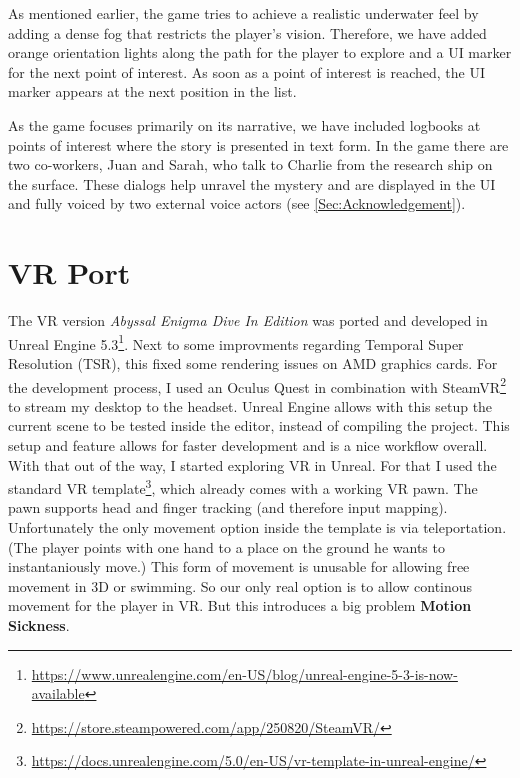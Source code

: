 \documentclass[letterpaper, 10 pt, conference]{ieeeconf}  %
\begin{document}
As mentioned earlier, the game tries to achieve a realistic underwater feel by adding a dense fog that restricts the player's vision.
Therefore, we have added orange orientation lights along the path for the player to explore and a UI marker for the next point of interest.
As soon as a point of interest is reached, the UI marker appears at the next position in the list.

As the game focuses primarily on its narrative, we have included logbooks at points of interest where the story is presented in text form.
In the game there are two co-workers, Juan and Sarah, who talk to Charlie from the research ship on the surface.
These dialogs help unravel the mystery and are displayed in the UI and fully voiced by two external voice actors (see \ref{Sec:Acknowledgement}).

\section{VR Port}
\label{Sec:VR}
The VR version \textit{Abyssal Enigma Dive In Edition} was ported and developed in Unreal Engine 5.3\footnote{\url{https://www.unrealengine.com/en-US/blog/unreal-engine-5-3-is-now-available}}.
Next to some improvments regarding Temporal Super Resolution (TSR), this fixed some rendering issues on AMD graphics cards.
For the development process, I used an Oculus Quest in combination with SteamVR\footnote{\url{https://store.steampowered.com/app/250820/SteamVR/}} to stream my desktop to the headset.
Unreal Engine allows with this setup the current scene to be tested inside the editor, instead of compiling the project.
This setup and feature allows for faster development and is a nice workflow overall.
With that out of the way, I started exploring VR in Unreal.
For that I used the standard VR template\footnote{\url{https://docs.unrealengine.com/5.0/en-US/vr-template-in-unreal-engine/}}, which already comes with a working VR pawn.
The pawn supports head and finger tracking (and therefore input mapping).
Unfortunately the only movement option inside the template is via teleportation.
(The player points with one hand to a place on the ground he wants to instantaniously move.)
This form of movement is unusable for allowing free movement in 3D or swimming.  
So our only real option is to allow continous movement for the player in VR.
But this introduces a big problem \textbf{Motion Sickness}.
\end{document}
